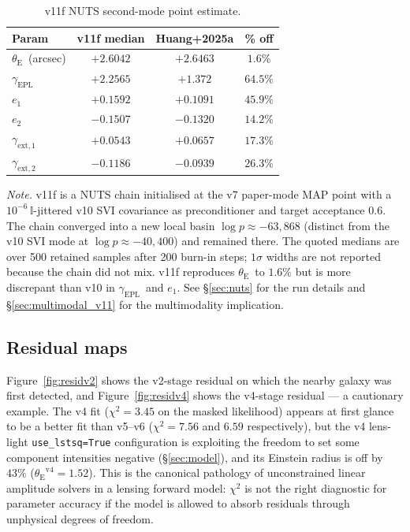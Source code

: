 \documentclass[11pt,letterpaper]{article}
\newcommand{\thetaE}{\ensuremath{\theta_{\mathrm{E}}}}
\newcommand{\gammaEPL}{\ensuremath{\gamma_{\mathrm{EPL}}}}
\newcommand{\gextone}{\ensuremath{\gamma_{\mathrm{ext},1}}}
\newcommand{\gexttwo}{\ensuremath{\gamma_{\mathrm{ext},2}}}
\newcommand{\eone}{\ensuremath{e_{1}}}
\newcommand{\etwo}{\ensuremath{e_{2}}}
\begin{document}
\begin{table}[ht]
\centering
\caption{v11f NUTS second-mode point estimate.}
\label{tab:nuts_v11f}
\begin{tabular}{lccc}
\toprule
Param & v11f median & Huang+2025a & \% off \\
\midrule
\thetaE\ (arcsec) & $+2.6042$ & $+2.6463$ & $1.6\%$ \\
\gammaEPL\        & $+2.2565$ & $+1.372$  & $64.5\%$ \\
\eone\            & $+0.1592$ & $+0.1091$ & $45.9\%$ \\
\etwo\            & $-0.1507$ & $-0.1320$ & $14.2\%$ \\
\gextone\         & $+0.0543$ & $+0.0657$ & $17.3\%$ \\
\gexttwo\         & $-0.1186$ & $-0.0939$ & $26.3\%$ \\
\bottomrule
\end{tabular}
\par\smallskip
{\footnotesize\textit{Note.} v11f is a NUTS chain initialised at the
v7 paper-mode MAP point with a $10^{-6}\,\mathbb{I}$-jittered v10 SVI
covariance as preconditioner and target acceptance $0.6$. The chain
converged into a new local basin $\log p \approx -63{,}868$
(distinct from the v10 SVI mode at $\log p \approx -40{,}400$) and
remained there. The quoted medians are over 500 retained samples
after 200 burn-in steps; $1\sigma$ widths are not reported because
the chain did not mix. v11f reproduces \thetaE\ to $1.6\%$ but is
more discrepant than v10 in \gammaEPL\ and \eone. See \S\ref{sec:nuts}
for the run details and \S\ref{sec:multimodal_v11} for the
multimodality implication.}
\end{table}

\subsection{Residual maps}
\label{sec:residuals}

Figure~\ref{fig:residv2} shows the v2-stage residual on which the
nearby galaxy was first detected, and Figure~\ref{fig:residv4} shows
the v4-stage residual --- a cautionary example. The v4 fit
($\chi^{2}=3.45$ on the masked likelihood) appears at first glance to
be a better fit than v5--v6 ($\chi^{2}=7.56$ and $6.59$ respectively),
but the v4 lens-light \texttt{use\_lstsq=True} configuration is
exploiting the freedom to set some component intensities negative
(\S\ref{sec:model}), and its Einstein radius is off by $43\%$
($\thetaE^{\mathrm{v4}}=1.52$). This is the canonical pathology of
unconstrained linear amplitude solvers in a lensing forward model:
$\chi^{2}$ is not the right diagnostic for parameter accuracy if the
model is allowed to absorb residuals through unphysical degrees of
freedom.
\end{document}
